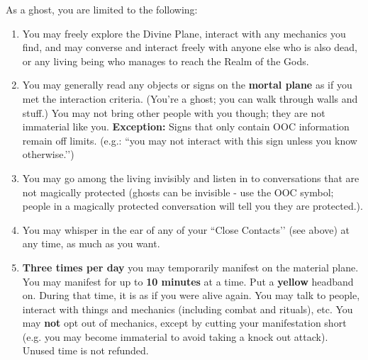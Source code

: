 \documentclass[green]{GL2020}
\begin{document}
As a ghost, you are limited to the following:
\begin{enumerate}
  \item You may freely explore the Divine Plane, interact with any mechanics you find, and may converse and interact freely with anyone else who is also dead, or any living being who manages to reach the Realm of the Gods.
  \item You may generally read any objects or signs on the \textbf{mortal plane} as if you met the interaction criteria. (You’re a ghost; you can walk through walls and stuff.) You may not bring other people with you though; they are not immaterial like you. \textbf{Exception:} Signs that only contain OOC information remain off limits. (e.g.: ``you may not interact with this sign unless you know otherwise.’’) 
  \item You may go among the living invisibly and listen in to conversations that are not magically protected (ghosts can be invisible - use the OOC symbol; people in a magically protected conversation will tell you they are protected.).
  \item You may whisper in the ear of any of your ``Close Contacts’’ (see above) at any time, as much as you want.
  \item \textbf{Three times per day} you may temporarily manifest on the material plane. You may manifest for up to \textbf{10 minutes} at a time. Put a \textbf{yellow} headband on. During that time, it is as if you were alive again. You may talk to people, interact with things and mechanics (including combat and rituals), etc. You may \textbf{not} opt out of mechanics, except by cutting your manifestation short (e.g. you may become immaterial to avoid taking a knock out attack). Unused time is not refunded.
\end{enumerate}
\end{document}
